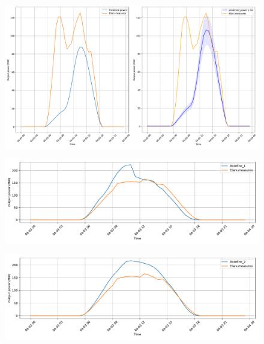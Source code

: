 \documentclass[a4paper, 12pt]{article}
\begin{document}
\begin{figure}[H]
    \centering
    \includegraphics[width=\textwidth]{resources/pdf/comparison_naive_posterior_27-03-2020.pdf}
    \label{fig:naive_posterior_3_april}
\end{figure}
\begin{figure}[H]
    \centering
    \includegraphics[width=\textwidth]{resources/pdf/baseline_1_27-03-2020.pdf}
    \label{fig:base_1_elia_3_april}
\end{figure}
\begin{figure}[H]
    \centering
    \includegraphics[width=\textwidth]{resources/pdf/baseline_2_27-03-2020.pdf}
    \label{fig:base_2_elia_3_april}
\end{figure}
\end{document}
